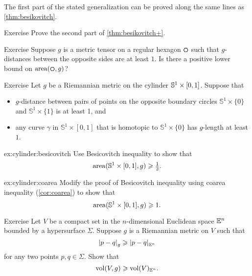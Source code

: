 The first part of the stated generalization can be proved along the same lines as \ref{thm:besikovitch}.

\begin{thm}{Exercise}\label{ex:besikovitch=}
Prove the second part of \ref{thm:besikovitch+}.
\end{thm}


\begin{thm}{Exercise}\label{ex:hexagon}
Suppose $g$ is a metric tensor on a regular hexagon $\textbf{\hexagon}$ such that $g$-distances between the opposite sides are at least $1$.
Is there a positive lower bound on $\area(\textbf{\hexagon},g)$?
\end{thm}

\begin{thm}{Exercise}\label{ex:cylinder}
Let $g$ be a Riemannian metric on the cylinder $\mathbb{S}^1\z\times [0,1]$.
Suppose that 
\begin{itemize}
\item 
$g$-distance between pairs of points on the opposite boundary circles $\mathbb{S}^1\times\{0\}$ and $\mathbb{S}^1\times\{1\}$ is at least 1, and 
\item
any curve $\gamma$ in $\mathbb{S}^1\times [0,1]$ that is homotopic to $\mathbb{S}^1\times\{0\}$ has $g$-length at least $1$.
\end{itemize}

\begin{subthm}{ex:cylinder:besicovitch}
Use Besicovitch inequality to show that
\[\operatorname{\rm area}\nolimits(\mathbb{S}^1\times [0,1],g)\geqslant \tfrac12.\]

\end{subthm}

\begin{subthm}{ex:cylinder:coarea}
 Modify the proof of Besicovitch inequality using coarea inequality (\ref{cor:coarea}) to show that \[\operatorname{\rm area}\nolimits(\mathbb{S}^1\times [0,1],g)\geqslant 1.\]
 
\end{subthm}

\end{thm}


\begin{thm}{Exercise}\label{ex:gadograph}
Let $V$ be a compact set in the $n$-dimensional Euclidean space $\mathbb{E}^n$ bounded by a hypersurface $\Sigma$.
Suppose $g$ is a Riemannian metric on $V$ such that 
\[\dist{p}{q}{g}\ge\dist{p}{q}{\EE^n}\]
for any two points $p,q\in \Sigma$.
Show that
\[\operatorname{\rm vol}\nolimits(V,g)\geqslant \operatorname{\rm vol}\nolimits(V)_{\mathbb{E}^n}.\]
 
\end{thm}


